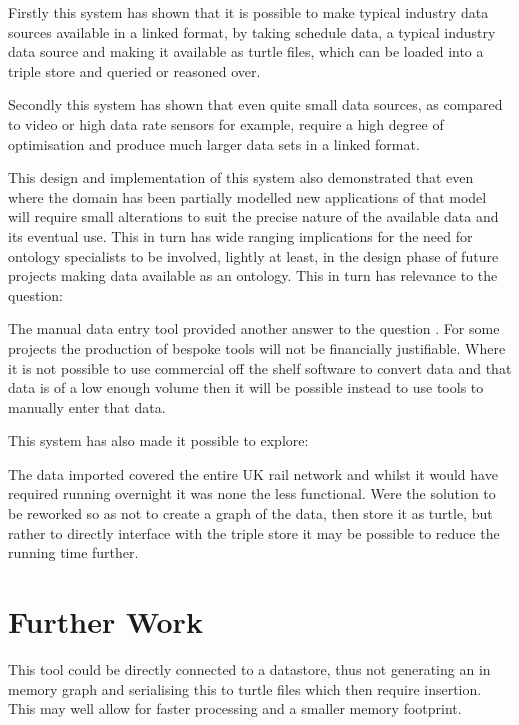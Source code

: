 Firstly this system has shown that it is possible to make typical industry data sources available in a linked format, by taking schedule data, a typical industry data source and making it available as turtle files, which can be loaded into a triple store and queried or reasoned over. 

Secondly this system has shown that even quite small data sources, as compared to video or high data rate sensors for example, require a high degree of optimisation and produce much larger data sets in a linked format. 

This design and implementation of this system also demonstrated that even where the domain has been partially modelled new applications of that model will require small alterations to suit the precise nature of the available data and its eventual use. This in turn has wide ranging implications for the need for ontology specialists to be involved, lightly at least, in the design phase of future projects making data available as an ontology. This in turn has relevance to the question: \textit{\QuestionSkillz}

The manual data entry tool provided another answer to the question \say{\QuestionOtherData}. For some projects the production of bespoke tools will not be financially justifiable. Where it is not possible to use commercial off the shelf software to convert data and that data is of a low enough volume then it will be possible instead to use tools to manually enter that data.

This system has also made it possible to explore: \textit{\QuestionCanOntologyScale}

The data imported covered the entire UK rail network and whilst it would have required running overnight it was none the less functional. Were the solution to be reworked so as not to create a graph of the data, then store it as turtle, but rather to directly interface with the triple store it may be possible to reduce the running time further.

\section{Further Work}
This tool could be directly connected to a datastore, thus not generating an in memory graph and serialising this to turtle files which then require insertion. This may well allow for faster processing and a smaller memory footprint. 